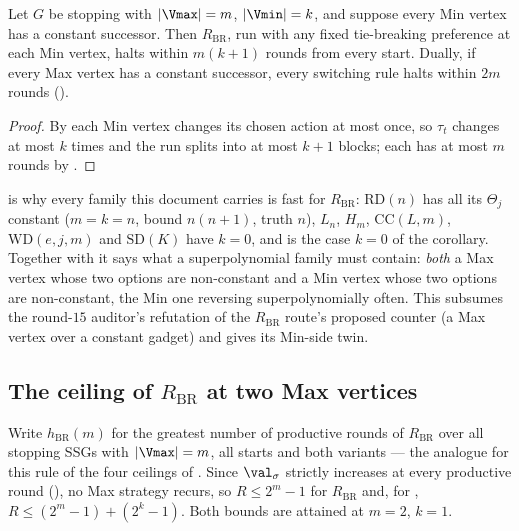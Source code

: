 \begin{corollary}\label{bsc:clamp}
Let $G$ be stopping with $|\Vmax|=m$, $|\Vmin|=k$, and suppose every Min
vertex has a constant successor.  Then $R_{\mathrm{BR}}$, run with any fixed
tie-breaking preference at each Min vertex, halts within $m(k+1)$ rounds from
every start.  Dually, if every Max vertex has a constant successor, every
switching rule halts within $2m$ rounds ().
\end{corollary}

\begin{proof}
By  each Min vertex changes its chosen action at most once,
so $\tau_t$ changes at most $k$ times and the run splits into at most $k+1$
blocks; each has at most $m$ rounds by .
\end{proof}

\begin{remark}\label{bsc:clamp-rem}
 is why every family this document carries is fast for
$R_{\mathrm{BR}}$: $\mathrm{RD}(n)$ has all its $\Theta_j$ constant
($m=k=n$, bound $n(n+1)$, truth $n$), $L_n$, $H_m$, $\mathrm{CC}(L,m)$,
$\mathrm{WD}(e,j,m)$ and $\mathrm{SD}(K)$ have $k=0$, and
 is the case $k=0$ of the corollary.  Together with
 it says what a superpolynomial family must contain:
\emph{both} a Max vertex whose two options are non-constant and a Min vertex
whose two options are non-constant, the Min one reversing superpolynomially
often.  This subsumes the round-$15$ auditor's refutation of the $R_{\mathrm{BR}}$
route's proposed counter (a Max vertex over a constant gadget) and gives its
Min-side twin.
\end{remark}

\subsection{The ceiling of $R_{\mathrm{BR}}$ at two Max vertices}

Write $h_{\mathrm{BR}}(m)$ for the greatest number of productive rounds of
$R_{\mathrm{BR}}$ over all stopping SSGs with $|\Vmax|=m$, all starts and both
variants --- the analogue for this rule of the four ceilings of
.  Since $\val_{\sigma}$ strictly increases at every
productive round (), no Max strategy recurs, so $R\le2^{m}-1$
for $R_{\mathrm{BR}}$ and, for , $R\le(2^{m}-1)+(2^{k}-1)$.
Both bounds are attained at $m=2$, $k=1$.

